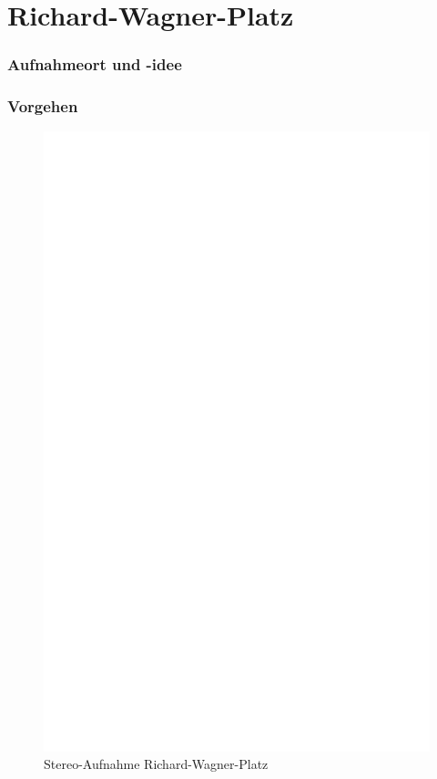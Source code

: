 \documentclass[liststotoc,bibtotoc,fontsize=14pt,]{scrreprt}
\begin{document}
	\section{Richard-Wagner-Platz}
	\label{sec:tunnel}
	\subsubsection{Aufnahmeort und -idee}
		
	\subsubsection{Vorgehen}


			 \newpage
			 \begin{figure}[h]
			 	\includegraphics[width=\linewidth]{img/ph.jpg}
			 	\caption{Stereo-Aufnahme Richard-Wagner-Platz}
			 \end{figure}
\end{document}
